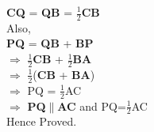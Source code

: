 \documentclass{article}
\begin{document}
	\textbf{CQ} = \textbf{QB} = $\frac{1}{2}$\textbf{CB}\\
	
	Also, \\
	
	\textbf{PQ} = \textbf{QB} + \textbf{BP}\\
	
$\Rightarrow$ $\frac{1}{2}$\textbf{CB} + $\frac{1}{2}$\textbf{BA}\\

$\Rightarrow$ $\frac{1}{2}$(\textbf{CB} + \textbf{BA})\\

$\Rightarrow$ PQ = $\frac{1}{2}$AC\\

$\Rightarrow$ \textbf{PQ}$\parallel$\textbf{AC} and PQ=$\frac{1}{2}$AC\\

	Hence Proved.
	
		
    

	
	
\end{document}
